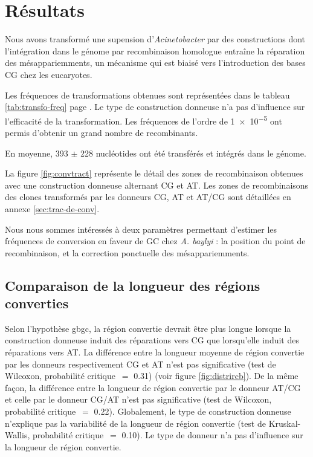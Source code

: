 \section{Résultats}
\label{sec:resultats}

Nous avons transformé une supension d'\emph{Acinetobacter} par des constructions
dont l'intégration dans le génome par recombinaison homologue entraîne la
réparation des mésappariemments, un mécanisme qui est biaisé vers l'introduction
des bases CG chez les eucaryotes.

Les fréquences de transformations obtenues sont représentées dans le tableau
\ref{tab:transfo-freq} page \pageref{tab:transfo-freq}. Le type de construction
donneuse n'a pas d'influence sur l'efficacité de la transformation. Les
fréquences de l'ordre de \num{1e-5} ont permis d'obtenir un grand nombre de
recombinants.

En moyenne, \num{393} \(\pm\) \num{228} nucléotides ont été transférés et
intégrés dans le génome.

La figure \ref{fig:convtract} représente le détail des zones de recombinaison
obtenues avec une construction donneuse alternant CG et AT. Les zones de
recombinaisons des clones transformés par les donneurs CG, AT et AT/CG sont
détaillées en annexe \ref{sec:trac-de-conv}.

Nous nous sommes intéressés à deux paramètres permettant d'estimer les
fréquences de conversion en faveur de GC chez \emph{A. baylyi} : la position du
point de recombinaison, et la correction ponctuelle des mésappariemments.

\subsection{Comparaison de la longueur des régions converties}
\label{subsec:longueur}

Selon l'hypothèse \ac{gbgc}, la région convertie devrait être plus longue
lorsque la construction donneuse induit des réparations vers CG que lorsqu'elle
induit des réparations vers AT. La différence entre la longueur moyenne de
région convertie par les donneurs respectivement CG et AT n'est pas
significative (test de Wilcoxon, probabilité critique~\(=\) \num{0.31}) (voir
figure \ref{fig:distrircb}). De la même façon, la différence entre la longueur
de région convertie par le donneur AT/CG et celle par le donneur CG/AT n'est pas
significative (test de Wilcoxon, probabilité critique~\(=\) \num{0.22}).
Globalement, le type de construction donneuse n'explique pas la variabilité de
la longueur de région convertie (test de Kruskal-Wallis, probabilité
critique~\(=\) \num{0.10}). Le type de donneur n'a pas d'influence sur la
longueur de région convertie.

